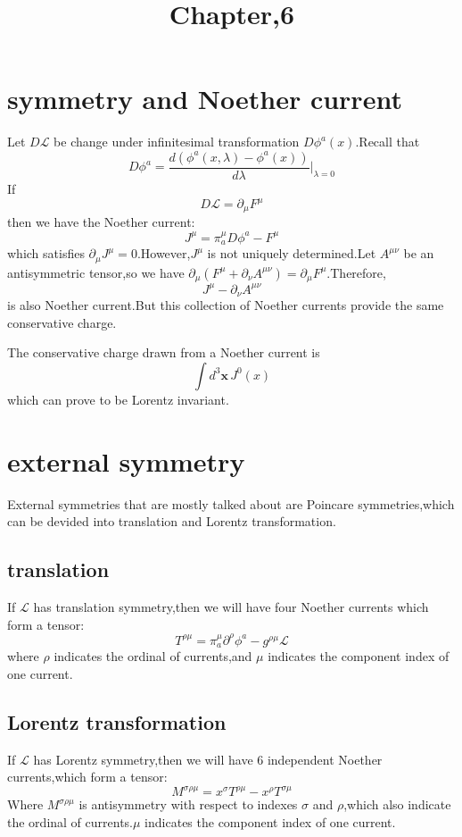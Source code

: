 \documentclass[a4paper]{article}
\begin{document}
	\title{Chapter,6}
	\date{ }
	\maketitle
\section{symmetry and Noether current}
Let $D\mathscr{L}$ be change under infinitesimal transformation $D\phi^a(x)$.Recall that$$D\phi^a=\frac{d(\phi^a(x,\lambda)-\phi^a(x))}{d\lambda}\Big|_{\lambda=0}$$
If$$D\mathscr{L}=\partial_{\mu}F^{\mu}$$
then we have the Noether current:$$J^{\mu}=\pi^{\mu}_aD\phi^a-F^{\mu}$$
which satisfies $\partial_{\mu}J^{\mu}=0$.However,$J^{\mu}$ is not uniquely determined.Let $A^{\mu\nu}$ be an antisymmetric tensor,so we have $\partial_{\mu}(F^{\mu}+\partial_{\nu}A^{\mu\nu})=\partial_{\mu}F^{\mu}$.Therefore,$$J^{\mu}-\partial_{\nu}A^{\mu\nu}$$is also Noether current.But this collection of Noether currents provide the same conservative charge.
\par The conservative charge drawn from a Noether current is$$\int d^3\bm{x}\, J^0(x)$$which can prove to be Lorentz invariant.
\section{external symmetry}
External symmetries that are mostly talked about are Poincare symmetries,which can be devided into translation and Lorentz transformation. 
\subsection{translation}
If $\mathscr{L}$ has translation symmetry,then we will have four Noether currents which form a tensor:$$T^{\rho\mu}=\pi^{\mu}_a\partial^{\rho}\phi^a-g^{\rho\mu}\mathscr{L}$$
where $\rho$ indicates the ordinal of currents,and $\mu$ indicates the component index of one current.
\subsection{Lorentz transformation}
If $\mathscr{L}$ has Lorentz symmetry,then we will have 6 independent Noether currents,which form a tensor:$$M^{\sigma\rho\mu}=x^{\sigma}T^{\rho\mu}-x^{\rho}T^{\sigma\mu}$$
Where $M^{\sigma\rho\mu}$ is antisymmetry with respect to indexes $\sigma$ and $\rho$,which also indicate the ordinal of currents.$\mu$ indicates the component index of one current.
\end{document}

